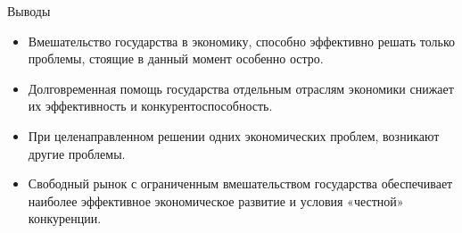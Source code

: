 \documentclass{beamer}
\begin{document}
	\begin{frame}{Выводы}
		\begin{itemize}
			\item Вмешательство государства в экономику, способно эффективно решать только проблемы, стоящие в данный момент особенно остро.
			\item Долговременная помощь государства отдельным отраслям экономики снижает их эффективность и конкурентоспособность.
			\item При целенаправленном решении одних экономических проблем, возникают другие проблемы.
			\item Свободный рынок с ограниченным вмешательством государства обеспечивает наиболее эффективное экономическое развитие и условия «честной» конкуренции.
		\end{itemize}
	\end{frame}
\end{document}
